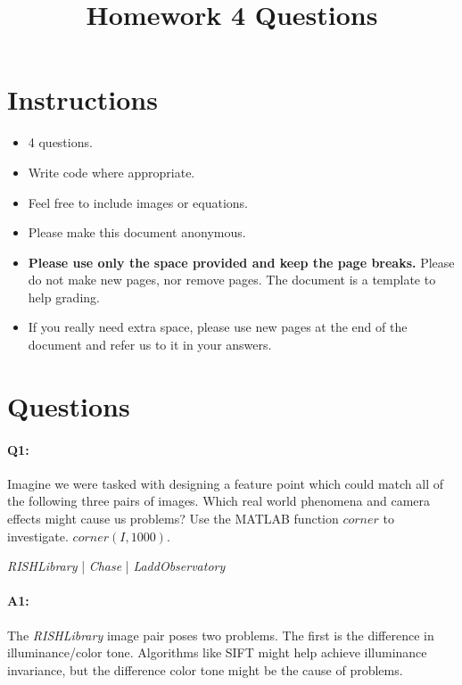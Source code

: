 \title{\vspace{-1cm}Homework 4 Questions}



\maketitle
\vspace{-3cm}
\thispagestyle{fancy}

\section*{Instructions}
\begin{itemize}
  \item 4 questions.
  \item Write code where appropriate.
  \item Feel free to include images or equations.
  \item Please make this document anonymous.
  \item \textbf{Please use only the space provided and keep the page breaks.} Please do not make new pages, nor remove pages. The document is a template to help grading.
  \item If you really need extra space, please use new pages at the end of the document and refer us to it in your answers.
\end{itemize}

\section*{Questions}

\paragraph{Q1:} Imagine we were tasked with designing a feature point which could match all of the following three pairs of images. Which real world phenomena and camera effects might cause us problems?
Use the MATLAB function \href{https://www.mathworks.com/help/images/ref/corner.html}{$corner$} to investigate. $corner(I,1000)$.

\emph{RISHLibrary} | \emph{Chase} | \emph{LaddObservatory}

\paragraph{A1:}

The \emph{RISHLibrary} image pair poses two problems. The first is the difference in illuminance/color tone. Algorithms like SIFT might help achieve illuminance invariance, but the difference color tone might be the cause of problems.

